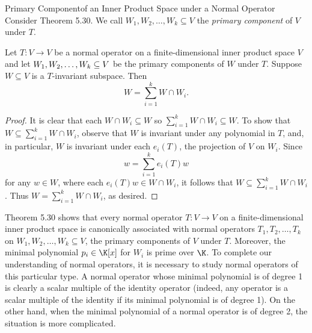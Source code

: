 \documentclass[linearalgebraII]{subfiles}
\begin{document}
    \begin{definition}{Primary Component}{of an Inner Product Space under a Normal Operator}
        Consider Theorem 5.30. We call $W_1,W_2,\ldots,W_k\subseteq V$ the \emph{primary component} of $V$ under $T$.
    \end{definition}

    \begin{cor}{}
        Let $T:V\to V$ be a normal operator on a finite-dimensional inner product space $V$ and let $W_1,W_2,\ldots,W_k\\\subseteq V$ be the primary components of $W$ under $T$. Suppose $W\subseteq V$ is a $T$-invariant subspace. Then
        \begin{equation*}
            W = \sum^{k}_{i=1} W\cap W_i.
        \end{equation*}
    \end{cor}	

    \begin{proof}
        It is clear that each $W\cap W_i\subseteq W$ so $\sum^{k}_{i=1} W\cap W_i\subseteq W$. To show that $W\subseteq \sum^{k}_{i=1} W\cap W_i$, observe that $W$ is invariant under any polynomial in $T$, and, in particular, $W$ is invariant under each $e_i(T)$, the projection of $V$ on $W_i$. Since
        \begin{equation*}
            w = \sum^{k}_{i=1} e_i(T)w
        \end{equation*}
        for any $w\in W$, where each $e_i(T)w\in W\cap W_i$, it follows that $W\subseteq\sum^{k}_{i=1} W\cap W_i$. Thus $W = \sum^{k}_{i=1} W\cap W_i$, as desired.
    \end{proof}

    \begin{remark}
        Theorem 5.30 shows that every normal operator $T:V\to V$ on a finite-dimensional inner product space is canonically associated with normal operators $T_1, T_2, \ldots, T_k$ on $W_1,W_2,\ldots,W_k\subseteq V$, the primary components of $V$ under $T$. Moreover, the minimal polynomial $p_i\in\K[x]$ for $W_i$ is prime over $\K$. To complete our understanding of normal operators, it is necessary to study normal operators of this particular type. A normal operator whose minimal polynomial is of degree 1 is clearly a scalar multiple of the identity operator (indeed, any operator is a scalar multiple of the identity if its minimal polynomial is of degree 1). On the other hand, when the minimal polynomial of a normal operator is of degree 2, the situation is more complicated.
    \end{remark}
\end{document}
